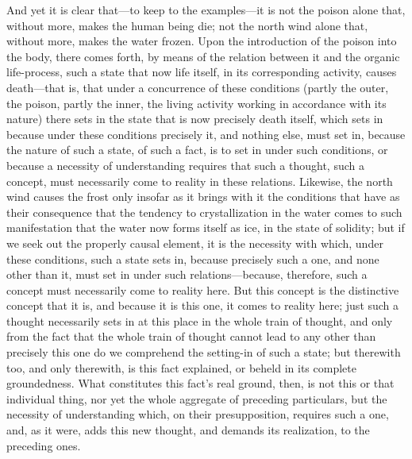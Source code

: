 \documentclass[12pt,a4paper]{book}
\begin{document}
And yet it is clear that---to keep to the examples---it is not the poison alone
that, without more, makes the human being die; not the north wind alone that,
without more, makes the water frozen. Upon the introduction of the poison into the
body, there comes forth, by means of the relation between it and the organic
life-process, such a state that now life itself, in its corresponding activity,
causes death---that is, that under a concurrence of these conditions (partly the
outer, the poison, partly the inner, the living activity working in accordance with
its nature) there sets in the state that is now precisely death itself, which sets
in because under these conditions precisely it, and nothing else, must set in,
because the nature of such a state, of such a fact, is to set in under such
conditions, or because a necessity of understanding requires that such a thought,
such a concept, must necessarily come to reality in these relations. Likewise, the
north wind causes the frost only insofar as it brings with it the conditions that
have as their consequence that the tendency to crystallization in the water comes to
such manifestation that the water now forms itself as ice, in the state of
solidity; but if we seek out the properly causal element, it is the necessity with
which, under these conditions, such a state sets in, because precisely such a one,
and none other than it, must set in under such relations---because, therefore, such
a concept must necessarily come to reality here. But this concept is the distinctive
concept that it is, and because it is this one, it comes to reality here; just such
a thought necessarily sets in at this place in the whole train of thought, and only
from the fact that the whole train of thought cannot lead to any other than
precisely this one do we comprehend the setting-in of such a state; but therewith
too, and only therewith, is this fact explained, or beheld in its complete
groundedness. What constitutes this fact's real ground, then, is not this or that
individual thing, nor yet the whole aggregate of preceding particulars, but the
necessity of understanding which, on their presupposition, requires such a one, and,
as it were, adds this new thought, and demands its realization, to the preceding ones.
\end{document}
